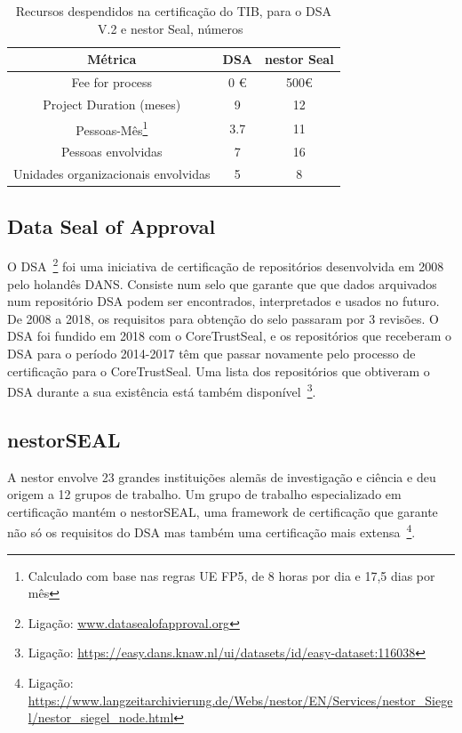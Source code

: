 \documentclass[sigconf,nonacm]{acmart}
\begin{document}
\begin{table}
    \caption{Recursos despendidos na certificação do TIB, para o DSA V.2 e nestor Seal, números~\cite{Lindlar_Schwab_2019}}\label{tab:tib_certification_numbers}
    \centering
    \scriptsize
    \begin{tabular}{|c|c|c|}
	\hline
    \textbf{Métrica} & \textbf{DSA} & \textbf{nestor Seal}\\
	\hline
	\hline
	Fee for process & 0 €  & 500€ \\
    Project Duration (meses) & 9 & 12 \\
	Pessoas-Mês\footnote{Calculado com base nas regras UE \gls{FP5}, de 8 horas por dia e 17,5 dias por mês} & 3.7 & 11\\
	Pessoas envolvidas & 7 & 16\\
	Unidades organizacionais envolvidas & 5 & 8\\
	\hline
    \end{tabular}
    \scriptsize
\end{table}

\subsection{Data Seal of Approval} %
\label{sub:data_seal_of_approval}

O \gls{DSA}~\footnote{Ligação: \url{www.datasealofapproval.org}} foi uma iniciativa de certificação de repositórios desenvolvida em 2008 pelo holandês \gls{DANS}. Consiste num selo que garante que que dados arquivados num repositório DSA podem ser encontrados, interpretados e usados no futuro. De 2008 a 2018, os requisitos para obtenção do selo passaram por 3 revisões. O DSA foi fundido em 2018 com o CoreTrustSeal, e os repositórios que receberam o DSA para o período 2014-2017 têm que passar novamente pelo processo de certificação para o CoreTrustSeal. Uma lista dos repositórios que obtiveram o DSA durante a sua existência está também disponível~\footnote{Ligação: \url{https://easy.dans.knaw.nl/ui/datasets/id/easy-dataset:116038}}.


\subsection{nestorSEAL} %
\label{sub:nestorseal}

A \gls{nestor} envolve 23 grandes instituições alemãs de investigação e ciência e deu origem a 12 grupos de trabalho. Um grupo de trabalho especializado em certificação mantém o nestorSEAL, uma framework de certificação que garante não só os requisitos do DSA mas também uma certificação mais extensa~\footnote{Ligação: \url{https://www.langzeitarchivierung.de/Webs/nestor/EN/Services/nestor_Siegel/nestor_siegel_node.html}}.
\end{document}
